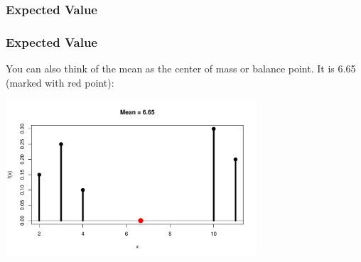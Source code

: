 \documentclass[handout]{beamer}
\newcommand{\blue}[1]{\textcolor{blue2}{#1}}
\newcommand{\prob}{\mbox{Pr}}
\newcommand{\E}{\mathbb{E}}
\begin{document}
\begin{frame}
\frametitle{Expected Value}
%
%
%
\end{frame}


\begin{frame}
\frametitle{Expected Value}
You can also think of the mean as the \blue{center of mass or balance point}. It is 6.65 (marked with red point):


\begin{center}
\includegraphics[width=0.7\textwidth]{figure/mean}
\end{center}

\end{frame}
\end{document}
